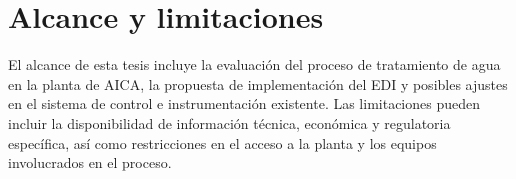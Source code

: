 \section{Alcance y limitaciones}
El alcance de esta tesis incluye la evaluación del proceso de tratamiento de agua en la planta de AICA, la propuesta de implementación del EDI y posibles ajustes en el sistema de control e instrumentación existente. Las limitaciones pueden incluir la disponibilidad de información técnica, económica y regulatoria específica, así como restricciones en el acceso a la planta y los equipos involucrados en el proceso.